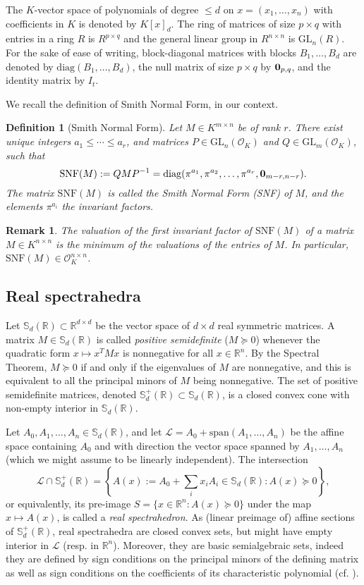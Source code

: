 \documentclass[a4paper,oneside,11pt]{article}
\newtheorem{definition}[theorem]{Definition}
\newtheorem{remark}[theorem]{Remark}
\newcommand{\R}{\mathbb{R}} %
\newcommand{\sym}{\mathbb{S}} %
\renewcommand{\span}[1]{{\text{span}(#1)}} %
\newcommand{\calL}{\mathcal{L}} %
\newcommand{\OK}{\mathcal{O}_K}
\def\diag{\mathrm{diag}}
\newcommand{\GL}{\mathrm{GL}}
\begin{document}
The $K$-vector space of polynomials of degree $\leq d$ on $x=(x_1,\ldots,x_n)$
with coefficients in $K$ is denoted by $K[x]_{d}$. The ring of matrices of
size $p \times q$ with entries in a ring $R$ is $R^{p \times q}$ and the general
linear group in $R^{n \times n}$ is $\GL_n(R)$.
For the sake of ease of writing, block-diagonal matrices with blocks
$B_1,\ldots,B_d$ are denoted by $\diag(B_1, \ldots, B_d)$, the null matrix of
size $p \times q$ by ${\bf 0}_{p,q}$, and the identity matrix by $I_t$.

We recall the definition of Smith Normal Form, in our context.
\begin{definition}[Smith Normal Form]\label{smith_nf}
  Let $M \in K^{m \times n}$ be of rank $r$. There exist unique integers $a_1 \leq \cdots \leq a_r$, and
  matrices $P \in \GL_n(\OK)$ and $Q \in \GL_m(\OK)$, such that
  $$
  \mathrm{SNF}(M) := QMP^{-1} = \diag(\pi^{a_1}, \pi^{a_2}, \ldots, \pi^{a_r}, {\bf 0}_{m-r,n-r}).
  $$
  The matrix $\mathrm{SNF}(M)$ is called the \emph{Smith Normal Form (SNF)} of $M$, and the elements $\pi^{a_i}$ the
  \emph{invariant factors}.
\end{definition}
\begin{remark}
  The valuation of the first invariant factor of $\mathrm{SNF}(M)$ of a matrix
  $M \in K^{n \times n}$ is the minimum of the valuations of the entries of
  $M$. In particular, $\mathrm{SNF}(M) \in \OK^{n \times n}$.
\end{remark}


\subsection{Real spectrahedra}

Let $\sym_d(\R) \subset \R^{d\times d}$ be the vector space of $d \times d$ real symmetric
matrices. A matrix $M \in \sym_d(\R)$
is called \emph{positive semidefinite} ($M \succeq 0$) whenever the quadratic
form $x \mapsto x^TMx$ is nonnegative for all $x\in \R^n$. By the Spectral Theorem, $M \succeq 0$
if and only if the eigenvalues of $M$ are nonnegative, and this is equivalent to all the principal minors
of $M$ being nonnegative. The set of positive semidefinite matrices, denoted $\sym_d^+(\R) \subset \sym_d(\R)$,
is a closed convex cone with non-empty interior in $\sym_d(\R)$.

Let $A_0,A_1,\ldots,A_n \in \sym_d(\R)$, and let $\calL = A_0+\span{A_1,\ldots,A_n}$ be the affine space
containing $A_0$ and with direction the vector space spanned by $A_1,\ldots,A_n$ (which we might assume
to be linearly independent). The intersection
$$
\calL \cap \sym_d^+(\R) = \left\{A(x) := A_0+\sum_i x_i A_i \in \sym_d(\R) :
A(x) \succeq 0\right\},
$$
or equivalently, its pre-image $S = \{x \in \R^n : A(x) \succeq 0\}$ under the map $x \mapsto A(x)$, is called
a \emph{real spectrahedron}. As (linear preimage of) affine sections of $\sym_d^+(\R)$, real spectrahedra
are closed convex sets, but might have empty interior in $\calL$ (resp. in $\R^n$).
Moreover, they are basic semialgebraic sets, indeed they are defined by sign conditions on the principal
minors of the defining matrix as well as sign conditions on the coefficients of its characteristic polynomial
(cf. ).
\end{document}
